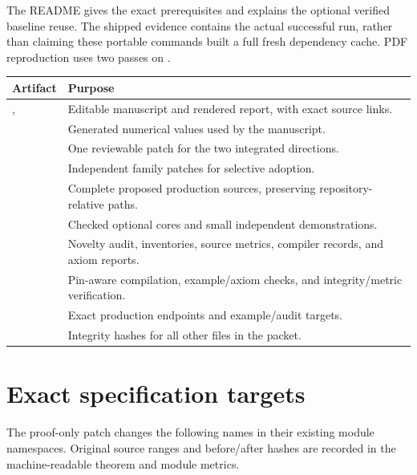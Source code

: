 \documentclass[11pt,a4paper]{article}
\newcommand{\code}[1]{\texttt{\detokenize{#1}}}
\begin{document}
The README gives the exact prerequisites and explains the optional verified
baseline reuse. The shipped evidence contains the actual successful run,
rather than claiming these portable commands built a full fresh dependency
cache. PDF reproduction uses two \code{pdflatex} passes on .

\begin{longtable}{@{}P{49mm}P{100mm}@{}}
\toprule
Artifact & Purpose\\
\midrule\endhead
{},  & Editable manuscript and rendered report, with exact source links.\\
 & Generated numerical values used by the manuscript.\\
 & One reviewable patch for the two integrated directions.\\
 & Independent family patches for selective adoption.\\
 & Complete proposed production sources, preserving repository-relative paths.\\
 & Checked optional cores and small independent demonstrations.\\
 & Novelty audit, inventories, source metrics, compiler records, and axiom reports.\\
 & Pin-aware compilation, example/axiom checks, and integrity/metric verification.\\
 & Exact production endpoints and example/audit targets.\\
 & Integrity hashes for all other files in the packet.\\
\bottomrule
\end{longtable}

\appendix
\section{Exact specification targets}

The proof-only patch changes the following names in their existing module
namespaces. Original source ranges and before/after hashes are recorded in
the machine-readable theorem and module metrics.
\end{document}
